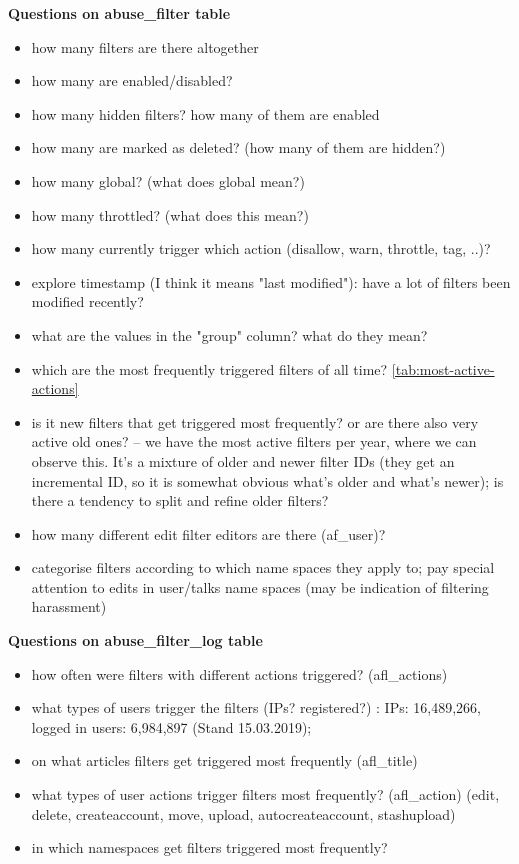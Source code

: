 \textbf{Questions on abuse\_filter table}
\begin{itemize}
    \item how many filters are there altogether
    \item how many are enabled/disabled?
    \item how many hidden filters? how many of them are enabled
    \item how many are marked as deleted? (how many of them are hidden?)
    \item how many global? (what does global mean?)
    \item how many throttled? (what does this mean?)
    \item how many currently trigger which action (disallow, warn, throttle, tag, ..)?
    \item explore timestamp (I think it means "last modified"): have a lot of filters been modified recently?
    \item what are the values in the "group" column? what do they mean?
    \item which are the most frequently triggered filters of all time? \ref{tab:most-active-actions}
    \item is it new filters that get triggered most frequently? or are there also very active old ones? -- we have the most active filters per year, where we can observe this. It's a mixture of older and newer filter IDs (they get an incremental ID, so it is somewhat obvious what's older and what's newer); is there a tendency to split and refine older filters?
    \item how many different edit filter editors are there (af\_user)?
    \item categorise filters according to which name spaces they apply to; pay special attention to edits in user/talks name spaces (may be indication of filtering harassment)
\end{itemize}

\textbf{Questions on abuse\_filter\_log table}
\begin{itemize}
    \item how often were filters with different actions triggered? (afl\_actions)
    \item what types of users trigger the filters (IPs? registered?) : IPs: 16,489,266, logged in users: 6,984,897 (Stand 15.03.2019);
    \item on what articles filters get triggered most frequently (afl\_title)
    \item what types of user actions trigger filters most frequently? (afl\_action) (edit, delete, createaccount, move, upload, autocreateaccount, stashupload)
    \item in which namespaces get filters triggered most frequently?
\end{itemize}

